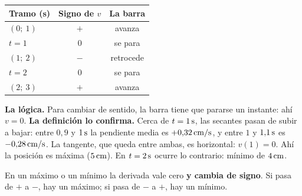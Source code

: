 \documentclass[11pt,a4paper]{article}
\begin{document}
\begin{minipage}[c]{.4\linewidth}
\centering\small
\begin{tabular}{@{}lcc@{}}
\toprule
Tramo (s) & Signo de $v$ & La barra\\
\midrule
$(0;\ 1)$ & $+$ & avanza\\
$t=1$ & $0$ & se para\\
$(1;\ 2)$ & $-$ & retrocede\\
$t=2$ & $0$ & se para\\
$(2;\ 3)$ & $+$ & avanza\\
\bottomrule
\end{tabular}
\end{minipage}\hfill
\begin{minipage}[c]{.58\linewidth}
\centering
{}
\end{minipage}

\smallskip
\textbf{La l\'ogica.} Para cambiar de sentido, la barra tiene que pararse un instante:
ah\'i $v=0$. \textbf{La definici\'on lo confirma.} Cerca de $t=1\,\mathrm{s}$, las
secantes pasan de subir a bajar: entre $0{,}9$ y $1\,\mathrm{s}$ la pendiente media es
$+0{,}32\,\mathrm{cm/s}$, y entre $1$ y $1{,}1\,\mathrm{s}$ es $-0{,}28\,\mathrm{cm/s}$.
La tangente, que queda entre ambas, es horizontal: $v(1)=0$. Ah\'i la posici\'on es
m\'axima ($5\,\mathrm{cm}$). En $t=2\,\mathrm{s}$ ocurre lo contrario: m\'inimo de $4\,\mathrm{cm}$.

En un m\'aximo o un m\'inimo la derivada vale cero \textbf{y cambia de signo}.
Si pasa de $+$ a $-$, hay un m\'aximo; si pasa de $-$ a $+$, hay un m\'inimo.
\end{document}
